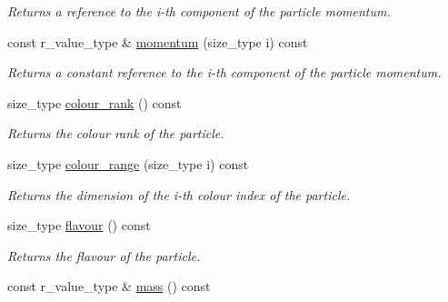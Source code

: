 \begin{DoxyCompactItemize}
\begin{DoxyCompactList}\small\item\em Returns a reference to the i-\/th component of the particle momentum. \end{DoxyCompactList}\item 
\hypertarget{a00019_a97a6c06706eef896190e981318171e9c}{}const r\+\_\+value\+\_\+type \& \hyperlink{a00019_a97a6c06706eef896190e981318171e9c}{momentum} (size\+\_\+type i) const \label{a00019_a97a6c06706eef896190e981318171e9c}

\begin{DoxyCompactList}\small\item\em Returns a constant reference to the i-\/th component of the particle momentum. \end{DoxyCompactList}\item 
\hypertarget{a00019_a0aeae7bdb659f9526f3ecf2790241c71}{}size\+\_\+type \hyperlink{a00019_a0aeae7bdb659f9526f3ecf2790241c71}{colour\+\_\+rank} () const \label{a00019_a0aeae7bdb659f9526f3ecf2790241c71}

\begin{DoxyCompactList}\small\item\em Returns the colour rank of the particle. \end{DoxyCompactList}\item 
\hypertarget{a00019_a4aaab3d10c04ee8a95a6efa3351e0a00}{}size\+\_\+type \hyperlink{a00019_a4aaab3d10c04ee8a95a6efa3351e0a00}{colour\+\_\+range} (size\+\_\+type i) const \label{a00019_a4aaab3d10c04ee8a95a6efa3351e0a00}

\begin{DoxyCompactList}\small\item\em Returns the dimension of the i-\/th colour index of the particle. \end{DoxyCompactList}\item 
\hypertarget{a00019_aefeccbe359caf71b0d900cdbf26ff3fc}{}size\+\_\+type \hyperlink{a00019_aefeccbe359caf71b0d900cdbf26ff3fc}{flavour} () const \label{a00019_aefeccbe359caf71b0d900cdbf26ff3fc}

\begin{DoxyCompactList}\small\item\em Returns the flavour of the particle. \end{DoxyCompactList}\item 
\hypertarget{a00019_a65e653d9a4b01618a66de41d755e0d67}{}const r\+\_\+value\+\_\+type \& \hyperlink{a00019_a65e653d9a4b01618a66de41d755e0d67}{mass} () const \label{a00019_a65e653d9a4b01618a66de41d755e0d67}


\end{DoxyCompactItemize}
